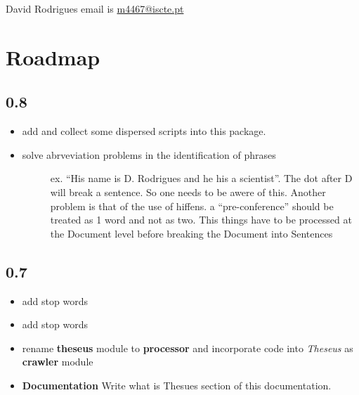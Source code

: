 \documentclass[letterpaper,10pt,english]{sphinxmanual}
\begin{document}
David Rodrigues email is \href{mailto:m4467@iscte.pt}{m4467@iscte.pt}


\section{Roadmap}
\label{TODO::doc}\label{TODO:roadmap}

\subsection{0.8}
\label{TODO:id1}\begin{itemize}
\item {} 
add  and collect some dispersed scripts into this package.

\item {} \begin{description}
\item[{solve abrveviation problems in the identification of phrases}] \leavevmode
ex. ``His name is D. Rodrigues and he his a scientist''. The dot after D will break a sentence.
So one needs to be awere of this.
Another problem is that of the use of hiffens. a ``pre-conference'' should be treated as 1 word and not as two.
This things have to be processed at the Document level before breaking the Document into Sentences

\end{description}

\end{itemize}


\subsection{0.7}
\label{TODO:id2}\begin{itemize}
\item {} 
add  stop words

\item {} 
add  stop words

\item {} 
rename \textbf{theseus} module to \textbf{processor} and incorporate  code into \emph{Theseus} as \textbf{crawler} module

\item {} 
\textbf{Documentation} Write what is Thesues section of this documentation.

\end{itemize}
\end{document}
